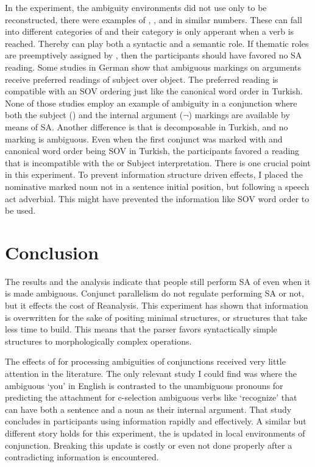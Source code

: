 In the experiment, the ambiguity environments did not use only {\Acc} to be reconstructed, there were examples of {\Dat}, {\Loc}, and {\Abl} in similar numbers. These can fall into different categories of {\Case} \citep{woolford2006lexical} and their category is only apperant when a verb is reached. Thereby {\Case} can play both a syntactic and a semantic role. If thematic roles are preemptively assigned by {\Case}, then the participants should have favored no SA reading. Some studies in German \citep{gorrell2000subject,schlesewsky2000subject,bader2000reanalyis} show that ambiguous {\Case} markings on arguments receive preferred readings of subject over object. The preferred reading is compatible with an SOV ordering just like the canonical word order in Turkish. None of those studies employ an example of {\Case} ambiguity in a conjunction where both the subject ({\Nom}) and the internal argument ({$\neg$\Nom}) {\Case} markings are available by means of SA. Another difference is that {\Case} is decomposable in Turkish, and no {\Case} marking is ambiguous. Even when the first conjunct was marked with {\Nom} and canonical word order being SOV in Turkish, the participants favored a reading that is incompatible with the {\Nom} or Subject interpretation. There is one crucial point in this experiment. To prevent information structure driven effects, I placed the nominative marked noun not in a sentence initial position, but following a speech act adverbial. This might have prevented the information like SOV word order to be used.


\section{Conclusion}

The results and the analysis indicate that people still perform SA of {\Case} even when it is made ambiguous. Conjunct parallelism do not regulate performing SA or not, but it effects the cost of Reanalysis. This experiment has shown that {\Case} information is overwritten for the sake of positing minimal structures, or structures that take less time to build. This means that the parser favors syntactically simple structures to morphologically complex operations.


The effects of {\Case} for processing ambiguities of conjunctions received very little attention in the literature. The only relevant study I could find was \cite{Traxler1996} where the {\Case} ambiguous `you' in English is contrasted to the unambiguous pronouns for predicting the attachment for c-selection ambiguous verbs like `recognize' that can have both a sentence and a noun as their internal argument. That study concludes in participants using {\Case} information rapidly and effectively. A similar but different story holds for this experiment, the {\Case} is updated in local environments of conjunction. Breaking this update is costly or even not done properly after a contradicting information is encountered.






